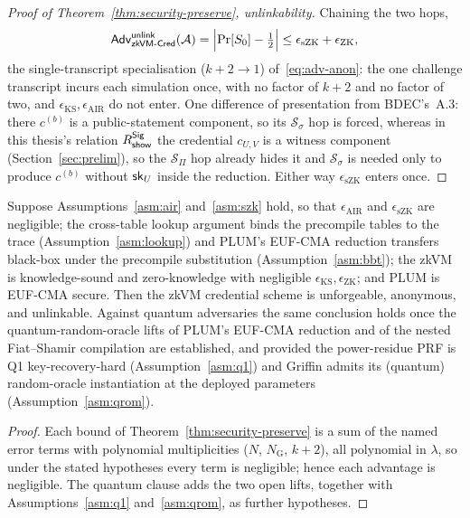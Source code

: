 \begin{proof}[Proof of Theorem~\ref{thm:security-preserve}, unlinkability]
    \smallskip\noindent Chaining the two hops,
    \[
      \mathsf{Adv}^{\mathsf{unlink}}_{\mathsf{zkVM\text{-}Cred}}(\mathcal A)
      =\Bigl|\Pr[S_0]-\tfrac12\Bigr|
      \le \epsilon_{\mathrm{sZK}}+\epsilon_{\mathrm{ZK}},
    \]
the single-transcript specialisation ($k+2\to1$) of~\eqref{eq:adv-anon}: the one challenge transcript incurs each simulation once, with no factor of $k+2$ and no factor of two, and $\epsilon_{\mathrm{KS}},\epsilon_{\mathrm{AIR}}$ do not enter. One difference of presentation from BDEC's~A.3: there $c^{(b)}$ is a public-statement component, so its $\mathcal S_\sigma$ hop is forced, whereas in this thesis's relation $R^{\mathsf{Sig}}_{\mathsf{show}}$ the credential $c_{U,V}$ is a witness component (Section~\ref{sec:prelim}), so the $\mathcal S_\Pi$ hop already hides it and $\mathcal S_\sigma$ is needed only to produce $c^{(b)}$ without $\mathsf{sk}_U$ inside the reduction. Either way $\epsilon_{\mathrm{sZK}}$ enters once.
\end{proof}

\begin{corollary}\label{cor:unconditional}
Suppose Assumptions~\ref{asm:air} and~\ref{asm:szk} hold, so that $\epsilon_{\mathrm{AIR}}$ and $\epsilon_{\mathrm{sZK}}$ are negligible; the cross-table lookup argument binds the precompile tables to the trace (Assumption~\ref{asm:lookup}) and PLUM's EUF-CMA reduction transfers black-box under the precompile substitution (Assumption~\ref{asm:bbt}); the zkVM is knowledge-sound and zero-knowledge with negligible $\epsilon_{\mathrm{KS}},\epsilon_{\mathrm{ZK}}$; and PLUM is EUF-CMA secure. Then the zkVM credential scheme is unforgeable, anonymous, and unlinkable. Against quantum adversaries the same conclusion holds once the quantum-random-oracle lifts of PLUM's EUF-CMA reduction and of the nested Fiat--Shamir compilation are established, and provided the power-residue PRF is Q1 key-recovery-hard (Assumption~\ref{asm:q1}) and Griffin admits its (quantum) random-oracle instantiation at the deployed parameters (Assumption~\ref{asm:qrom}).
\end{corollary}

\begin{proof}
Each bound of Theorem~\ref{thm:security-preserve} is a sum of the named error terms with polynomial multiplicities ($N$, $N_{\mathrm G}$, $k+2$), all polynomial in $\lambda$, so under the stated hypotheses every term is negligible; hence each advantage is negligible. The quantum clause adds the two open lifts, together with Assumptions~\ref{asm:q1} and~\ref{asm:qrom}, as further hypotheses.
\end{proof}

